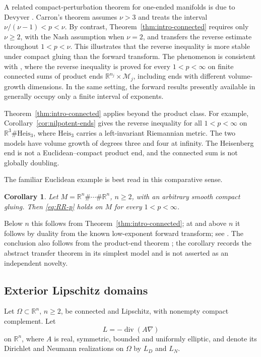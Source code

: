 \documentclass[12pt]{amsart}
\newcommand\R{\mathbb{R}}
\newcommand{\diver}{\operatorname{div}}
\newtheorem{corollary}[theorem]{Corollary}
\theoremstyle{remark}
\begin{document}
A related compact-perturbation theorem
for one-ended manifolds is due to Devyver \cite{Devyver15}.  Carron's theorem
assumes $\nu>3$ and treats the interval $\nu/(\nu-1)<p<\nu$.  By contrast,
Theorem~\ref{thm:intro-connected} requires only $\nu\ge 2$, with the Nash assumption when $\nu=2$, and transfers the
reverse estimate throughout $1<p<\nu$.  This illustrates that the reverse
inequality is more stable under compact gluing than the forward transform.
The phenomenon is consistent with \cite{He26}, where the reverse inequality
is proved for every $1<p<\infty$ on finite connected sums of product ends
$\R^{n_j}\times\mathcal M_j$, including ends with different volume-growth
dimensions.  In the same setting, the forward results presently available
in \cite{CarronCoulhonHassell06,HassellSikora09} generally occupy only a finite
interval of exponents.

Theorem~\ref{thm:intro-connected} applies beyond the product class.
For example, Corollary~\ref{cor:nilpotent-ends} gives the reverse inequality
for all $1<p<\infty$ on $\R^3\#\mathrm{Heis}_3$, where
$\mathrm{Heis}_3$ carries a left-invariant Riemannian metric.  The two
models have volume growth of degrees three and four at infinity.  The
Heisenberg end is not a Euclidean--compact product end, and the connected
sum is not globally doubling. 

The familiar Euclidean example is best read in this comparative sense.

\begin{corollary}\label{cor:intro-euclidean-sum}
Let $M=\R^n\#\cdots\#\R^n$, $n\geq2$, with an arbitrary smooth compact
gluing.  Then \eqref{eq:RR-p} holds on $M$ for every $1<p<\infty$.
\end{corollary}

Below $n$ this follows from Theorem~\ref{thm:intro-connected}; at and above
$n$ it follows by duality from the known low-exponent forward transform; see \cite{CarronCoulhonHassell06}. The conclusion also follows from the product-end theorem \cite{He26}; the corollary records the abstract transfer theorem in its simplest
model and is not asserted as an independent novelty.

\subsection*{Exterior Lipschitz domains}

Let $\Omega\subset\R^n$, $n\geq2$, be connected and Lipschitz, with
nonempty compact complement.  Let
\[
 L=-\diver(A\nabla)
\]
on $\R^n$, where $A$ is real, symmetric, bounded and uniformly elliptic,
and denote its Dirichlet and Neumann realizations on $\Omega$ by
$L_D$ and $L_N$.
\end{document}

